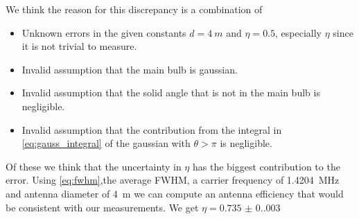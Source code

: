 We think the reason for this discrepancy is a combination of
\begin{itemize}
    \item Unknown errors in the given constants $d = \SI{4}{m}$ and $\eta = 0.5$, especially $\eta$ since it is not trivial to measure.
    \item Invalid assumption that the main bulb is gaussian.
    \item Invalid assumption that the solid angle that is not in the main bulb is negligible.
    \item Invalid assumption that the contribution from the integral in \eqref{eq:gauss_integral} of the gaussian with $\theta > \pi$ is negligible.
\end{itemize}
Of these we think that the uncertainty in $\eta$ has the biggest contribution to the error. Using \eqref{eq:fwhm},the average FWHM, a carrier frequency of \SI{1.4204}{\mega \hertz} and antenna diameter of \SI{4}{m}
we can compute an antenna efficiency that would be consistent with our measurements. We get $\eta = \SI{0.735(0.003)}{}$